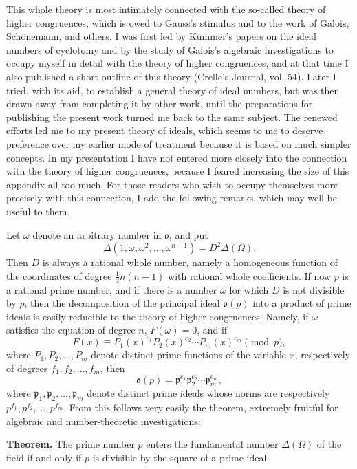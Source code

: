 \documentclass[11pt]{article}
\newcommand{\origpage}[1]{\par\vspace{0.25em}\noindent{\footnotesize\itshape [Printed page #1]}\par\vspace{0.25em}}
\newcommand{\ideal}[1]{\mathfrak{#1}}
\begin{document}
\origpage{404}
This whole theory is most intimately connected with the so-called theory of higher congruences, which is owed to Gauss's stimulus and to the work of Galois, Schönemann, and others. I was first led by Kummer's papers on the ideal numbers of cyclotomy and by the study of Galois's algebraic investigations to occupy myself in detail with the theory of higher congruences, and at that time I also published a short outline of this theory (Crelle's Journal, vol. 54). Later I tried, with its aid, to establish a general theory of ideal numbers, but was then drawn away from completing it by other work, until the preparations for publishing the present work turned me back to the same subject. The renewed efforts led me to my present theory of ideals, which seems to me to deserve preference over my earlier mode of treatment because it is based on much simpler concepts. In my presentation I have not entered more closely into the connection with the theory of higher congruences, because I feared increasing the size of this appendix all too much. For those readers who wish to occupy themselves more precisely with this connection, I add the following remarks, which may well be useful to them.

Let $\omega$ denote an arbitrary number in $\ideal{o}$, and put
\[
\Delta(1,\omega,\omega^2,\ldots,\omega^{n-1})=D^2\Delta(\Omega).
\]
Then $D$ is always a rational whole number, namely a homogeneous function of the coordinates of degree $\frac12 n(n-1)$ with rational whole coefficients. If now $p$ is a rational prime number, and if there is a number $\omega$ for which $D$ is not divisible by $p$, then the decomposition of the principal ideal $\ideal{o}(p)$ into a product of prime ideals is easily reducible to the theory of higher congruences. Namely, if $\omega$ satisfies the equation of degree $n$, $F(\omega)=0$, and if
\[
F(x)\equiv P_1(x)^{e_1}P_2(x)^{e_2}\cdots P_m(x)^{e_m}\pmod p,
\]
where $P_1,P_2,\ldots,P_m$ denote distinct prime functions of the variable $x$, respectively of degrees $f_1,f_2,\ldots,f_m$, then
\[
\ideal{o}(p)=\ideal{p}_1^{e_1}\ideal{p}_2^{e_2}\cdots\ideal{p}_m^{e_m},
\]
where $\ideal{p}_1,\ideal{p}_2,\ldots,\ideal{p}_m$ denote distinct prime ideals whose norms are respectively $p^{f_1},p^{f_2},\ldots,p^{f_m}$. From this follows very easily the theorem, extremely fruitful for algebraic and number-theoretic investigations:

\medskip
\noindent\textbf{Theorem.} The prime number $p$ enters the fundamental number $\Delta(\Omega)$ of the field if and only if $p$ is divisible by the square of a prime ideal.
\end{document}
